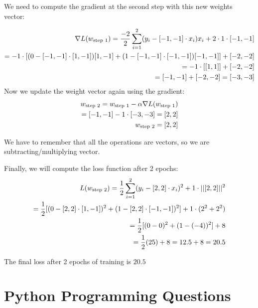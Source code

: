 \documentclass[12pt]{article}
\begin{document}
\begin{enumerate}
\begin{enumerate}
   We need to compute the gradient at the second step with this new weights vector:

   \begin{align}
    \nabla L(w_{\text{step 1}}) = \frac{-2}{2} \sum_{i=1}^{2} (y_i - [-1,-1] \cdot x_i) x_i + 2 \cdot 1 \cdot [-1,-1] \notag \\ 
    = -1 \cdot [(0 - [-1,-1] \cdot [1,-1])[1,-1] + (1 - [-1,-1] \cdot [-1,-1])[-1,-1]] + [-2,-2] \notag \\ 
    = -1 \cdot [[1,1]] + [-2,-2] \notag \\ 
    = [-1,-1] + [-2,-2] = [-3,-3] \notag \\ 
   \end{align}
   Now we update the weight vector again using the gradient: \\ 
   \begin{align}
    w_{\text{step 2}} = w_{\text{step 1}} - \alpha \nabla L(w_{\text{step 1}}) \notag \\ 
    = [-1,-1] - 1 \cdot [-3,-3] = [2,2] \notag \\ 
    w_{\text{step 2}} = [2,2] \notag
   \end{align}

   We have to remember that all the operations are vectors, so we are subtracting/multiplying vector. 

   Finally, we will compute the loss function after 2 epochs: 
   \begin{align}
   L(w_{\text{step 2}}) = \frac{1}{2} \sum_{i=1}^{2} (y_i - [2,2] \cdot x_i)^2 + 1 \cdot ||[2,2]||^2 \notag \\
   = \frac{1}{2} [(0 - [2,2] \cdot [1,-1])^2 + (1 - [2,2] \cdot [-1,-1])^2] + 1 \cdot (2^2 + 2^2) \notag \\ 
   = \frac{1}{2} [(0-0)^2 + (1-(-4))^2] + 8 \notag \\ 
   = \frac{1}{2} (25) + 8 = 12.5 + 8 = 20.5 \notag 
   \end{align}

   The final loss after 2 epochs of training is $20.5$
  \end{enumerate}
\end{enumerate}

\section{Python Programming Questions}

\end{document}
